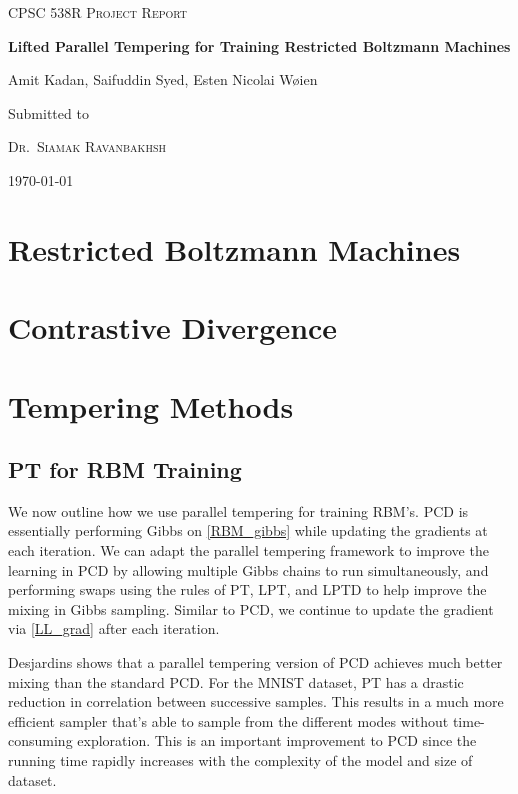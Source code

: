 \documentclass[12pt]{article}
\begin{document}
\begin{titlepage}
	\centering
	
	{\scshape \Large CPSC 538R Project Report
\par}
	\vspace{1cm}
	{\huge\bfseries Lifted Parallel Tempering for Training Restricted Boltzmann Machines
\par}
	\vspace{0.5cm}
	{\Large  Amit Kadan, Saifuddin Syed, Esten Nicolai W{\o}ien
\par}

	\vfill
	Submitted to\par
	{\scshape Dr.~Siamak Ravanbakhsh}\\
		{ \today\par}



\end{titlepage}

\tableofcontents
\newpage


\section{Restricted Boltzmann Machines}


\section{Contrastive Divergence}

\section{Tempering Methods}

\subsection{PT for RBM Training}
We now outline how we use parallel tempering for training RBM's. PCD is essentially performing Gibbs on \eqref{RBM_gibbs} while updating the gradients at each iteration. We can adapt the parallel tempering framework to improve the learning in PCD by allowing multiple Gibbs chains to run simultaneously, and performing swaps using the rules of PT, LPT, and LPTD to help improve the mixing in Gibbs sampling. Similar to PCD, we continue to update the gradient via \eqref{LL_grad} after each iteration. 

Desjardins \cite{desjardins2010tempered} shows that a parallel tempering version of PCD achieves much better mixing than the standard PCD. For the MNIST dataset, PT has a drastic reduction in correlation between successive samples. This results in a much more efficient sampler that's able to sample from the different modes without time-consuming exploration. This is an important improvement to PCD since the running time rapidly increases with the complexity of the model and size of dataset.
\end{document}
